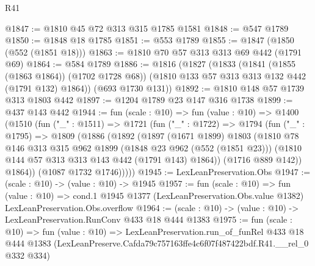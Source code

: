 \begin{lexlean}{R41}
\begin{coremodule}
@1847 := @1810 @45 @72 @313 @315 @1785 @1581
@1848 := @547 @1789
@1850 := @1848 @18 @1785
@1851 := @553 @1789
@1855 := @1847 (@1850 (@552 (@1851 @18)))
@1863 := @1810 @70 @57 @313 @313 @69 @442 (@1791 @69)
@1864 := @584 @1789
@1886 := @1816
    (@1827
      (@1833
        (@1841 (@1855 (@1863 @1864)) (@1702 @1728 @68))
        (@1810 @133 @57 @313 @313 @132 @442 (@1791 @132) @1864))
      (@693 @1730 @131))
@1892 := @1810 @148 @57 @1739 @313 @1803 @442
@1897 := @1204 @1789 @23 @147 @316 @1738
@1899 := @437 @143 @442
@1944 := fun (scale : @10) =>
  fun (value : @10) =>
  @1400
    (@1510
      (fun ("_" : @1511) =>
      @1721
        (fun ("_" : @1722) =>
        @1794
          (fun ("_" : @1795) =>
          @1809
            (@1886
              (@1892
                (@1897
                  (@1671 @1899)
                  @1803
                  (@1810
                    @78
                    @146
                    @313
                    @315
                    @962
                    @1899
                    (@1848 @23 @962 (@552 (@1851 @23)))
                    (@1810 @144 @57 @313 @313 @143 @442 (@1791 @143) @1864))
                  (@1716 @889 @142))
                @1864))
            (@1087 @1732 @1746)))))
@1945 := LexLeanPreservation.Obs
@1947 := (scale : @10) -> (value : @10) -> @1945
@1957 := fun (scale : @10) =>
  fun (value : @10) =>
  cond.{1} @1945 @1377 (LexLeanPreservation.Obs.value @1382) LexLeanPreservation.Obs.overflow
@1964 := (scale : @10) -> (value : @10) -> LexLeanPreservation.RunConv @433 @18 @444 @1383
@1975 := fun (scale : @10) =>
  fun (value : @10) =>
  LexLeanPreservation.run_of_funRel
    @433
    @18
    @444
    @1383
    (LexLeanPreserve.Cafda79c757163ffe4c6f07f487422bdf.R41.__rel_0 @332 @334)
\end{coremodule}
\end{lexlean}
